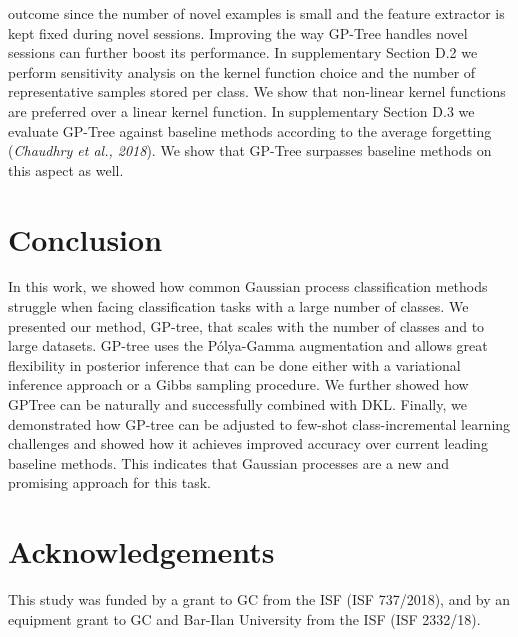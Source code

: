 \documentclass[preprint,11pt]{elsarticle}
\begin{document}
        outcome since the number of novel examples is small and
        the feature extractor is kept fixed during novel sessions. Improving
        the way GP-Tree handles novel sessions can further
        boost its performance. In supplementary Section D.2 we
        perform sensitivity analysis on the kernel function choice
        and the number of representative samples stored per class.
        We show that non-linear kernel functions are preferred over
        a linear kernel function. In supplementary Section D.3 we
        evaluate GP-Tree against baseline methods according to the
        average forgetting (\textit{Chaudhry et al., 2018}\cite{chaudhry2018riemannian}). We show that
        GP-Tree surpasses baseline methods on this aspect as well.

    \section{Conclusion}
    \label{sec:6}
    In this work, we showed how common Gaussian process
    classification methods struggle when facing classification
    tasks with a large number of classes. We presented our
    method, GP-tree, that scales with the number of classes and
    to large datasets. GP-tree uses the Pólya-Gamma augmentation
    and allows great flexibility in posterior inference that
    can be done either with a variational inference approach or
    a Gibbs sampling procedure. We further showed how GPTree
    can be naturally and successfully combined with DKL.
    Finally, we demonstrated how GP-tree can be adjusted to
    few-shot class-incremental learning challenges and showed
    how it achieves improved accuracy over current leading
    baseline methods. This indicates that Gaussian processes
    are a new and promising approach for this task.
    \section*{Acknowledgements}
    This study was funded by a grant to GC from the ISF (ISF 737/2018), and by an equipment
    grant to GC and Bar-Ilan University from the ISF (ISF 2332/18).
\end{document}
